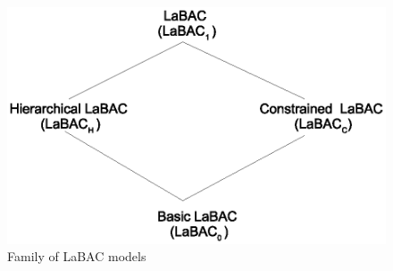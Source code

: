 	\begin{figure}
		\centering
		\includegraphics[width=.5\textwidth]{labac-family}
		\caption{Family of LaBAC models}
		\label{fig:labac-family}
	\end{figure}
	